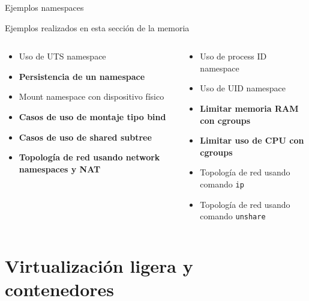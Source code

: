 \documentclass[aspectratio=169,xcolor=dvipsnames]{beamer}
\begin{document}
	\begin{frame}{Ejemplos namespaces}
	    \begin{alertblock}{Ejemplos realizados en esta sección de la memoria}
	        \begin{columns}
	        \begin{column}{0.5\textwidth}
	            \begin{itemize}
	                \item Uso de UTS namespace
	                \item \textbf{Persistencia de un namespace}
	                \item Mount namespace con dispositivo físico
	                \item \textbf{Casos de uso de montaje tipo bind}
	                \item \textbf{Casos de uso de shared subtree}
	                \item \textbf{Topología de red usando network namespaces y NAT}
	            \end{itemize}
	        \end{column}
	        
	        \begin{column}{0.5\textwidth}
	            \begin{itemize}
	                \item Uso de process ID namespace
	                \item Uso de UID namespace
	                \item \textbf{Limitar memoria RAM con cgroups}
	                \item \textbf{Limitar uso de CPU con cgroups}
	                \item Topología de red usando comando \texttt{ip}
	                \item Topología de red usando comando \texttt{unshare}
	            \end{itemize}
	        \end{column}
	    \end{columns}
	    \end{alertblock}
	\end{frame}
	
	
	\section{Virtualización ligera y contenedores}
	
\end{document}
